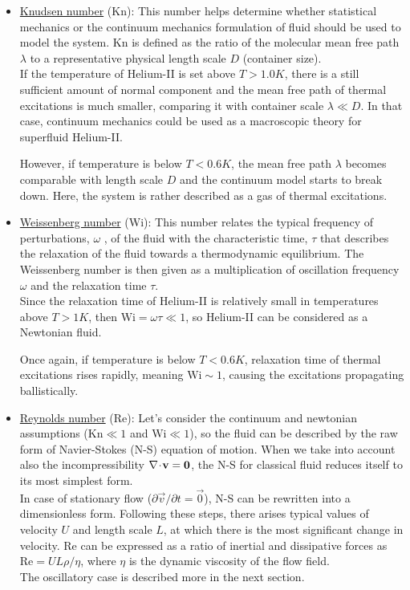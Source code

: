 \begin{itemize}
	\item \underline{Knudsen number} (Kn): This number helps determine whether statistical mechanics or the continuum mechanics formulation of fluid should be used to model the system. Kn is defined as the ratio of the molecular mean free path $\lambda$ to a representative physical length scale $D$ (container size).\\
	If the temperature of Helium-II is set above $T > 1.0 \unit{K}$, there is a still sufficient amount of normal component and the mean free path of thermal excitations is much smaller, comparing it with container scale $\lambda \ll D$. In that case, continuum mechanics could be used as a macroscopic theory for superfluid Helium-II.

	However, if temperature is below $T < 0.6 \unit{K}$, the mean free path $\lambda$ becomes comparable with length scale $D$ and the continuum model starts to break down. Here, the system is rather described as a gas of thermal excitations.

	\item \underline{Weissenberg number} (Wi): This number relates the typical frequency of perturbations, $\omega$ , of the fluid with the characteristic time, $\tau$ that describes the relaxation of the fluid towards a thermodynamic equilibrium. The Weissenberg number is then given as a multiplication of oscillation frequency $\omega$ and the relaxation time $\tau$.\\
	Since the relaxation time of Helium-II is relatively small in temperatures above $T > 1\unit{K}$, then $\text{Wi} = \omega \tau \ll 1$, so Helium-II can be considered as a Newtonian fluid.

	Once again, if temperature is below $T < 0.6 \unit{K}$, relaxation time of thermal excitations rises rapidly, meaning $\text{Wi} \sim 1$, causing the excitations propagating ballistically.

	\item \underline{Reynolds number} (Re): Let's consider the continuum and newtonian assumptions ($\text{Kn} \ll 1$ and $\text{Wi} \ll 1$), so the fluid can be described by the raw form of Navier-Stokes (N-S) equation of motion. When we take into account also the incompressibility $\nabla \!\cdot\! \mathbf{v} = \mathbf{0}$, the N-S for classical fluid reduces itself to its most simplest form.\\
	In case of stationary flow ($\partial \vec{v} / \partial t = \vec{0}$), N-S can be rewritten into a dimensionless form. Following these steps, there arises typical values of velocity $U$ and length scale $L$, at which there is the most significant change in velocity. Re can be expressed as a ratio of inertial and dissipative forces as $\text{Re} = U L \rho / \eta$, where $\eta$ is the dynamic viscosity of the flow field.\\
	The oscillatory case is described more in the next section.

\end{itemize}

